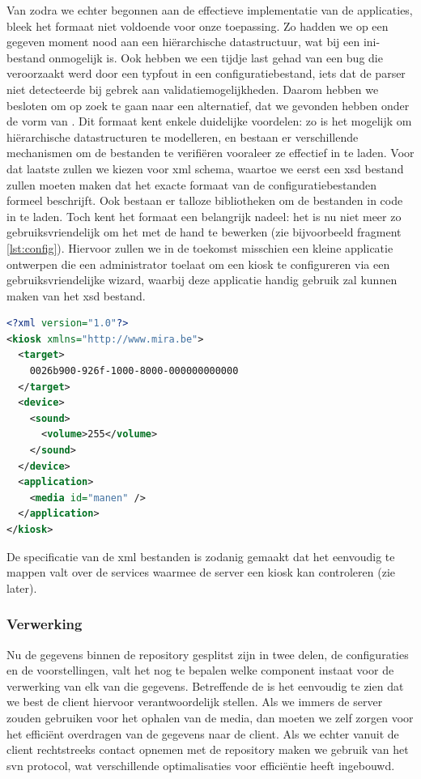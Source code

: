 Van zodra we echter begonnen aan de effectieve implementatie van de applicaties, bleek het formaat niet voldoende voor onze toepassing. Zo hadden we op een gegeven moment nood aan een hiërarchische datastructuur, wat bij een ini-bestand onmogelijk is. Ook hebben we een tijdje last gehad van een bug die veroorzaakt werd door een typfout in een configuratiebestand, iets dat de parser niet detecteerde bij gebrek aan validatiemogelijkheden. Daarom hebben we besloten om op zoek te gaan naar een alternatief, dat we gevonden hebben onder de vorm van . Dit formaat kent enkele duidelijke voordelen: zo is het mogelijk om hiërarchische datastructuren te modelleren, en bestaan er verschillende mechanismen om de bestanden te verifiëren vooraleer ze effectief in te laden. Voor dat laatste zullen we kiezen voor \ac{xml} schema, waartoe we eerst een \ac{xsd} bestand zullen moeten maken dat het exacte formaat van de configuratiebestanden formeel beschrijft. Ook bestaan er talloze bibliotheken om de bestanden in code in te laden. Toch kent het formaat een belangrijk nadeel: het is nu niet meer zo gebruiksvriendelijk om het met de hand te bewerken (zie bijvoorbeeld fragment \ref{lst:config}). Hiervoor zullen we in de toekomst misschien een kleine applicatie ontwerpen die een administrator toelaat om een kiosk te configureren via een gebruiksvriendelijke wizard, waarbij deze applicatie handig gebruik zal kunnen maken van het \ac{xsd} bestand. 

\begin{lstlisting}[language=XML, float, caption=Voorbeeld van een kiosk configuratiebstand., label=lst:config]
<?xml version="1.0"?>
<kiosk xmlns="http://www.mira.be">
  <target>
    0026b900-926f-1000-8000-000000000000
  </target>
  <device>
    <sound>
      <volume>255</volume>
    </sound>
  </device>
  <application>
    <media id="manen" />
  </application>
</kiosk>
\end{lstlisting}

De specificatie van de \ac{xml} bestanden is zodanig gemaakt dat het eenvoudig te mappen valt over de services waarmee de server een kiosk kan controleren (zie later).

\subsubsection{Verwerking}

Nu de gegevens binnen de repository gesplitst zijn in twee delen, de configuraties en de voorstellingen, valt het nog te bepalen welke component instaat voor de verwerking van elk van die gegevens. Betreffende de  is het eenvoudig te zien dat we best de client hiervoor verantwoordelijk stellen. Als we immers de server zouden gebruiken voor het ophalen van de media, dan moeten we zelf zorgen voor het efficiënt overdragen van de gegevens naar de client. Als we echter vanuit de client rechtstreeks contact opnemen met de repository maken we gebruik van het \ac{svn} protocol, wat verschillende optimalisaties voor efficiëntie heeft ingebouwd.

